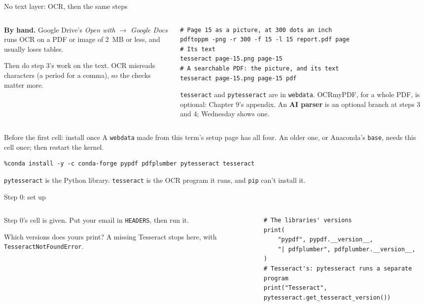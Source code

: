 \documentclass[9pt,aspectratio=169]{beamer}
\begin{document}
\begin{frame}[fragile]{No text layer: OCR, then the same steps}
    \begin{columns}[T]
        \begin{column}{0.37\textwidth}
            \textbf{By hand.} Google Drive's \textit{Open with $\to$ Google Docs} runs OCR on a PDF or image of 2~MB or less, and usually loses tables.

            \medskip
            Then do step 3's work on the text. OCR misreads characters (a period for a comma), so the checks matter more.
        \end{column}
        \begin{column}{0.6\textwidth}
\begin{lstlisting}
# Page 15 as a picture, at 300 dots an inch
pdftoppm -png -r 300 -f 15 -l 15 report.pdf page
# Its text
tesseract page-15.png page-15
# A searchable PDF: the picture, and its text
tesseract page-15.png page-15 pdf
\end{lstlisting}
            \scriptsize \texttt{tesseract} and \texttt{pytesseract} are in \texttt{webdata}. OCRmyPDF, for a whole PDF, is optional: Chapter 9's appendix. An \textbf{AI parser} is an optional branch at steps 3 and 4; Wednesday shows one.
        \end{column}
    \end{columns}
\end{frame}

\begin{frame}[fragile]{Before the first cell: install once}
    A \texttt{webdata} made from this term's setup page has all four. An older one, or Anaconda's \texttt{base}, needs this cell once; then restart the kernel.
\begin{lstlisting}
%conda install -y -c conda-forge pypdf pdfplumber pytesseract tesseract
\end{lstlisting}
    \texttt{pytesseract} is the Python library. \texttt{tesseract} is the OCR program it runs, and \texttt{pip} can't install it.
\end{frame}

\begin{frame}[fragile]{Step 0: set up}
    \begin{columns}[T]
        \begin{column}{0.37\textwidth}
            Step 0's cell is given. Put your email in \texttt{HEADERS}, then run it.

            \medskip
            Which versions does yours print? A missing Tesseract stops here, with \texttt{TesseractNotFoundError}.
        \end{column}
        \begin{column}{0.6\textwidth}
\begin{lstlisting}
# The libraries' versions
print(
    "pypdf", pypdf.__version__,
    "| pdfplumber", pdfplumber.__version__,
)
# Tesseract's: pytesseract runs a separate program
print("Tesseract", pytesseract.get_tesseract_version())
\end{lstlisting}
        \end{column}
    \end{columns}
\end{frame}
\end{document}
